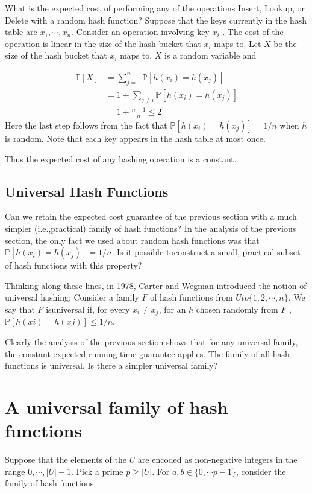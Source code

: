\documentclass [12pt]{article}
\begin{document}
What is the expected cost of performing any of the operations Insert, Lookup, or Delete with a random hash function? Suppose that the keys currently in the hash table are $x_1, \cdots, x_n$. Consider an operation involving key $x_i$ . The cost of the operation is linear in the size of the hash bucket that $x_i$ maps to. Let $X$ be the size of the hash bucket that $x_i$ maps to. $X$ is a random variable and

\begin{align*}
  \mathbb{E}[X] &= \sum_{j=1}^n \mathbb{P}[h(x_i) = h(x_j)] \\
  &= 1 + \sum_{j\neq i} \mathbb{P}[h(x_i) = h(x_j)] \tag{We are guaranteed to collide with ourselves} \\
  &= 1 + \frac{n-1}{n} \leq 2
\end{align*}
Here the last step follows from the fact that $\mathbb{P}[h(x_i ) = h(x_j )] = 1/n$ when $h$ is random. Note that each key appears in the hash table at most once.

Thus the expected cost of any hashing operation is a constant.

\subsection{Universal Hash Functions}
Can we retain the expected cost guarantee of the previous section with a much simpler (i.e.,practical) family of hash functions? In the analysis of the previous section, the only fact we used about random hash functions was that $\mathbb{P}[h(x_i ) = h(x_j )] = 1/n$. Is it possible toconstruct a small, practical subset of hash functions with this property?

Thinking along these lines, in 1978, Carter and Wegman introduced the notion of universal hashing: Consider a family $F$ of hash functions from $U to \{1, 2, \cdots , n\}$. We say that $F$ isuniversal if, for every $x_i \neq x_j$, for an $h$ chosen randomly from $F$ , $\mathbb{P}[h(xi ) = h(xj )] \leq 1/n$.

Clearly the analysis of the previous section shows that for any universal family, the constant expected running time guarantee applies. The family of all hash functions is universal. Is there a simpler universal family?

\section{A universal family of hash functions} 
Suppose that the elements of the $U$ are encoded as non-negative integers in the range ${0, \cdots, |U| - 1}$. Pick a prime $p \geq |U|$. For $a, b \in \{0, \cdots p - 1\}$, consider the family of hash functions 
\end{document}
